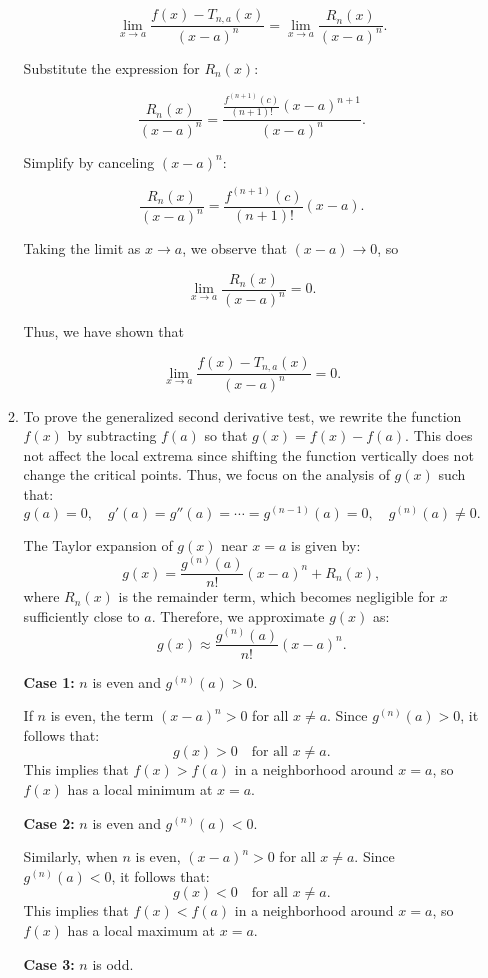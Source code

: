\documentclass[12pt]{article}
\begin{document}
\begin{enumerate}
\begin{enumerate}
\[
\lim_{x \to a} \frac{f(x) - T_{n,a}(x)}{(x-a)^n} = \lim_{x \to a} \frac{R_n(x)}{(x-a)^n}.
\]

Substitute the expression for $R_n(x)$:

\[
\frac{R_n(x)}{(x-a)^n} = \frac{\frac{f^{(n+1)}(c)}{(n+1)!}(x-a)^{n+1}}{(x-a)^n}.
\]

Simplify by canceling $(x-a)^n$:

\[
\frac{R_n(x)}{(x-a)^n} = \frac{f^{(n+1)}(c)}{(n+1)!}(x-a).
\]

Taking the limit as $x \to a$, we observe that $(x-a) \to 0$, so

\[
\lim_{x \to a} \frac{R_n(x)}{(x-a)^n} = 0.
\]

Thus, we have shown that

\[
\lim_{x \to a} \frac{f(x) - T_{n,a}(x)}{(x-a)^n} = 0.
\]

\item 
To prove the generalized second derivative test, we rewrite the function \(f(x)\) by subtracting \(f(a)\) so that \(g(x) = f(x) - f(a)\). This does not affect the local extrema since shifting the function vertically does not change the critical points. Thus, we focus on the analysis of \(g(x)\) such that:
\[
g(a) = 0, \quad g'(a) = g''(a) = \cdots = g^{(n-1)}(a) = 0, \quad g^{(n)}(a) \neq 0.
\]

The Taylor expansion of \(g(x)\) near \(x = a\) is given by:
\[
g(x) = \frac{g^{(n)}(a)}{n!}(x-a)^n + R_n(x),
\]
where \(R_n(x)\) is the remainder term, which becomes negligible for \(x\) sufficiently close to \(a\). Therefore, we approximate \(g(x)\) as:
\[
g(x) \approx \frac{g^{(n)}(a)}{n!}(x-a)^n.
\]

\textbf{Case 1:} \(n\) is even and \(g^{(n)}(a) > 0\).

If \(n\) is even, the term \((x-a)^n > 0\) for all \(x \neq a\). Since \(g^{(n)}(a) > 0\), it follows that:
\[
g(x) > 0 \quad \text{for all } x \neq a.
\]
This implies that \(f(x) > f(a)\) in a neighborhood around \(x = a\), so \(f(x)\) has a local minimum at \(x = a\).

\textbf{Case 2:} \(n\) is even and \(g^{(n)}(a) < 0\).

Similarly, when \(n\) is even, \((x-a)^n > 0\) for all \(x \neq a\). Since \(g^{(n)}(a) < 0\), it follows that:
\[
g(x) < 0 \quad \text{for all } x \neq a.
\]
This implies that \(f(x) < f(a)\) in a neighborhood around \(x = a\), so \(f(x)\) has a local maximum at \(x = a\).

\textbf{Case 3:} \(n\) is odd.


\end{enumerate}
\end{enumerate}
\end{document}
